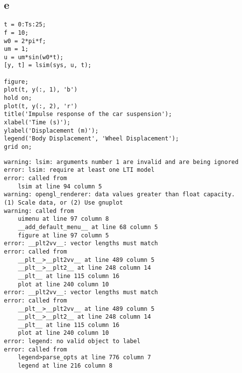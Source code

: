 \documentclass[11pt]{article}
\begin{document}
\subsection{e}
\label{sec:org3084835}
\begin{verbatim}
t = 0:Ts:25;
f = 10;
w0 = 2*pi*f;
um = 1;
u = um*sin(w0*t);
[y, t] = lsim(sys, u, t);

figure;
plot(t, y(:, 1), 'b')
hold on;
plot(t, y(:, 2), 'r')
title('Impulse response of the car suspension');
xlabel('Time (s)');
ylabel('Displacement (m)');
legend('Body Displacement', 'Wheel Displacement');
grid on;
\end{verbatim}

\label{}
\begin{verbatim}
warning: lsim: arguments number 1 are invalid and are being ignored
error: lsim: require at least one LTI model
error: called from
    lsim at line 94 column 5
warning: opengl_renderer: data values greater than float capacity.  (1) Scale data, or (2) Use gnuplot
warning: called from
    uimenu at line 97 column 8
    __add_default_menu__ at line 68 column 5
    figure at line 97 column 5
error: __plt2vv__: vector lengths must match
error: called from
    __plt__>__plt2vv__ at line 489 column 5
    __plt__>__plt2__ at line 248 column 14
    __plt__ at line 115 column 16
    plot at line 240 column 10
error: __plt2vv__: vector lengths must match
error: called from
    __plt__>__plt2vv__ at line 489 column 5
    __plt__>__plt2__ at line 248 column 14
    __plt__ at line 115 column 16
    plot at line 240 column 10
error: legend: no valid object to label
error: called from
    legend>parse_opts at line 776 column 7
    legend at line 216 column 8
\end{verbatim}
\end{document}
